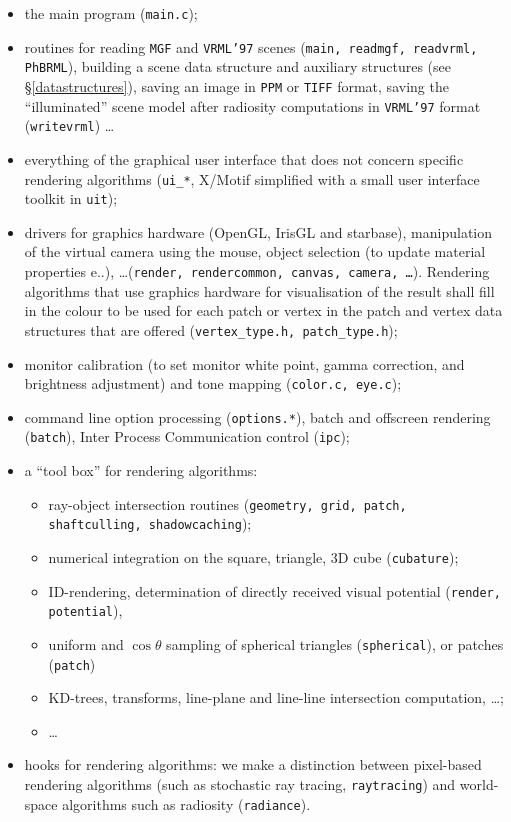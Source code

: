 \documentclass[11pt]{report}
\begin{document}
\begin{itemize}
\item the main program ({\tt main.c});
\item routines for reading {\tt MGF} and {\tt VRML'97} scenes 
  ({\tt main, readmgf, readvrml, PhBRML}), building
  a scene data structure and auxiliary structures (see \S\ref{datastructures}),
  saving an image in {\tt PPM} or {\tt TIFF} format, saving the ``illuminated''
  scene model after radiosity computations in {\tt VRML'97} format ({\tt writevrml}) 
  \ldots
\item everything of the graphical user interface that does not concern specific
  rendering algorithms ({\tt ui\_*}, X/Motif
  simplified with a small user interface toolkit in {\tt uit});
\item drivers for graphics hardware (OpenGL, IrisGL and starbase), manipulation
  of the virtual camera using the mouse, object selection (to update material 
  properties e\@.\@g.), \ldots ({\tt render,
  rendercommon, canvas, camera, \ldots}). Rendering algorithms that
  use graphics hardware for visualisation of the result shall fill in the
  colour to be used for each patch or vertex in the patch and vertex
  data structures that are offered ({\tt vertex\_type.h, patch\_type.h});
\item monitor calibration (to set monitor white point, gamma correction,
  and brightness adjustment) and tone mapping ({\tt color.c, eye.c});
\item command line option processing ({\tt options.*}), batch and offscreen
  rendering ({\tt batch}), Inter Process Communication control ({\tt ipc});
\item a ``tool box'' for rendering algorithms:
  \begin{itemize}
  \item ray-object intersection routines ({\tt geometry, grid, patch,
      shaftculling, shadowcaching});
  \item numerical integration on the square, triangle, 3D cube ({\tt cubature});
  \item ID-rendering, determination of directly received visual potential
    ({\tt render, potential}),
  \item uniform and $\cos\theta$ sampling of spherical triangles
    ({\tt spherical}), or patches ({\tt patch})
  \item KD-trees, transforms, line-plane and line-line intersection computation, \ldots;
  \item \ldots
  \end{itemize}
\item hooks for rendering algorithms: we make a distinction between 
  pixel-based rendering algorithms (such as stochastic ray tracing, 
  {\tt raytracing}) and world-space algorithms such as radiosity 
  ({\tt radiance}).
\end{itemize}
\end{document}
